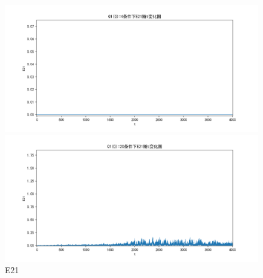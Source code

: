 \documentclass[10pt, a4paper]{article}
\begin{document}
    \begin{figure}[H]
        \begin{minipage}[t]{0.49\textwidth}
            \centering
            \includegraphics[width=\textwidth]{./q5_pics/cmp/E21.png}
        \end{minipage}
        \begin{minipage}[t]{0.49\textwidth}
            \centering
            \includegraphics[width=\textwidth]{./q5_pics/exp/E21.png}
        \end{minipage}
        \caption{E21}\label{fig:E21 in q5}
    \end{figure}
\end{document}

